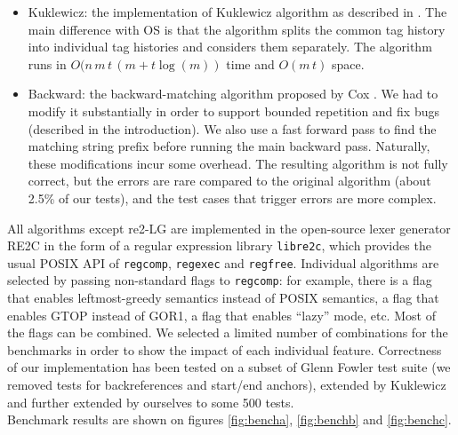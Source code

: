 \documentclass[AMA,STIX1COL]{WileyNJD-v2}
\begin{document}
\begin{itemize}[itemsep=0.2em, topsep=0.5em]
\item Kuklewicz: the implementation of Kuklewicz algorithm \cite{Kuk07} as described in \cite{Tro17}.
    The main difference with OS is that the algorithm splits the common tag history into individual tag histories and considers them separately.
    The algorithm runs in $O(n \, m \, t \, (m + t \log(m))$ time and $O(m \, t)$ space.

\item Backward: the backward-matching algorithm proposed by Cox \cite{Cox09}.
    We had to modify it substantially in order to support bounded repetition and fix bugs (described in the introduction).
    We also use a fast forward pass to find the matching string prefix before running the main backward pass.
    Naturally, these modifications incur some overhead.
    The resulting algorithm is not fully correct, but the errors are rare compared to the original algorithm (about 2.5\% of our tests),
    and the test cases that trigger errors are more complex.
\\[-0.5em]
\end{itemize}

All algorithms except re2-LG are implemented in the open-source lexer generator RE2C \cite{RE2C}
in the form of a regular expression library \texttt{libre2c},
which provides the usual POSIX API of \texttt{regcomp}, \texttt{regexec} and \texttt{regfree}.
Individual algorithms are selected by passing non-standard flags to \texttt{regcomp}:
for example, there is a flag that enables leftmost-greedy semantics instead of POSIX semantics,
a flag that enables GTOP instead of GOR1,
a flag that enables ``lazy'' mode, etc.
Most of the flags can be combined.
We selected a limited number of combinations for the benchmarks
in order to show the impact of each individual feature.
Correctness of our implementation has been tested on a subset of Glenn Fowler test suite \cite{Fow03}
(we removed tests for backreferences and start/end anchors),
extended by Kuklewicz and further extended by ourselves to some 500 tests.
\\

Benchmark results are shown on figures \ref{fig:bencha}, \ref{fig:benchb} and \ref{fig:benchc}.

 \datatableX
\pgfplotstabletranspose{\datatable}{\datatableX}

\def\plotheight{1.5in}
\def\plotshift{\linewidth/5*3}
\end{document}
